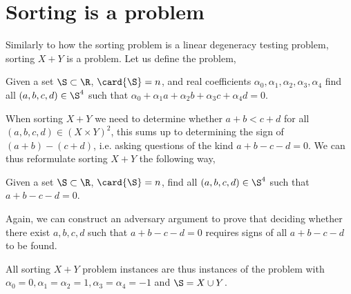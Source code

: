 \section{Sorting \XY is a \fourLDT problem}
\label{tree:related:xy4ldt}

Similarly to how the sorting problem is a linear degeneracy testing problem,
sorting $X+Y$ is a \fourLDT problem. Let us define the \fourLDT problem,

\begin{problem}
Given a set $\S \subset \R$, $\card{\S} = n$, and real coefficients $\alpha_0,
\alpha_1, \alpha_2, \alpha_3, \alpha_4$ find all $(a,b,c,d) \in \S^4$ such that
$\alpha_0 + \alpha_1 a + \alpha_2 b + \alpha_3 c + \alpha_4 d = 0$.
\end{problem}

When sorting $X+Y$ we need to determine whether $a + b < c + d$ for all
$(a,b,c,d) \in (X \times Y)^2$, this sums up to determining the sign of $(a+b) -
(c+d)$, i.e. asking questions of the kind $a + b - c - d = 0$. We can thus
reformulate sorting $X+Y$ the following way,

\begin{problem}
Given a set $\S \subset \R$, $\card{\S} = n$, find all $(a,b,c,d) \in \S^4$ such
that $a + b - c - d = 0$.
\end{problem}

Again, we can construct an adversary argument to prove that deciding whether
there exist \(a,b,c,d\) such that \(a+b-c-d=0\) requires signs of all
\(a+b-c-d\) to be found.

All sorting $X+Y$ problem instances are thus instances of the \fourLDT problem
with $\alpha_0 = 0, \alpha_1 = \alpha_2 = 1, \alpha_3 = \alpha_4 = -1$ and
$\S = X \cup Y$.

